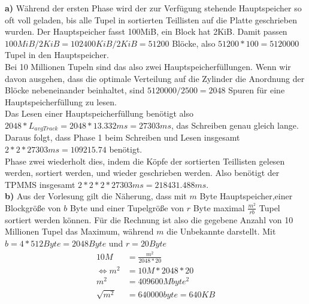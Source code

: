 \documentclass[12pt]{article}
\begin{document}
\noindent\textbf{a)} 
Während der ersten Phase wird der zur Verfügung stehende Hauptspeicher so oft voll
geladen, bis alle Tupel in sortierten Teillisten auf die Platte geschrieben
wurden. Der Hauptspeicher fasst 100MiB, ein Block hat 2KiB.
Damit passen $100MiB / 2KiB = 102400KiB / 2KiB = 51200$ Blöcke, also $51200 * 100
= 5120000$ Tupel in den Hauptspeicher.
\\[.5em]
Bei 10 Millionen Tupeln sind das also zwei Hauptspeicherfüllungen.
Wenn wir davon ausgehen, dass die optimale Verteilung auf die Zylinder die
Anordnung der Blöcke nebeneinander beinhaltet, sind $5120000/2500 = 2048$ Spuren
für eine Hauptspeicherfüllung zu lesen.
\\[.5em]
Das Lesen einer Hauptspeicherfüllung benötigt also $2048 * L_{avgTrack} = 2048 * 13.332ms = 27303ms$,
das Schreiben genau gleich lange. Daraus folgt, dass Phase 1 beim Schreiben und
Lesen insgesamt $2*2*27303ms = 109215.74$ benötigt.
\\[.5em]
Phase zwei wiederholt dies, indem die Köpfe der sortierten Teillisten gelesen
werden, sortiert werden, und wieder geschrieben werden. Also
benötigt der TPMMS insgesamt $2*2*2*27303ms = 218431.488ms$.
\\[1em]
\textbf{b)} Aus der Vorlesung gilt die Näherung, dass mit $m$ Byte
Hauptspeicher,einer Blockgröße von $b$ Byte und einer Tupelgröße von $r$ Byte
maximal $\frac{m^2}{rb}$ Tupel sortiert werden können.
Für die Rechnung ist also die gegebene Anzahl von 10 Millionen Tupel das
Maximum, während $m$ die Unbekannte darstellt. Mit $b=4*512 Byte = 2048 Byte$ und
$r = 20Byte$
\begin{align*}
    10M &= \frac{m^2}{2048 * 20}\\
    \Leftrightarrow m^2 &= 10M * 2048 * 20\\
    m^2 &= 409600M byte^2\\
    \sqrt{m^2} &= 640000 byte = 640KB
\end{align*}
\end{document}
